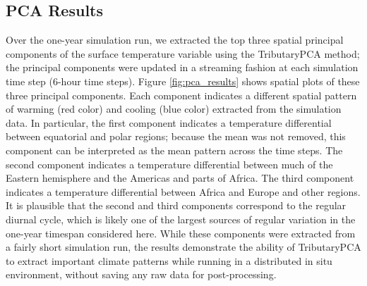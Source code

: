 \documentclass{juliacon}
\begin{document}
\subsection{PCA Results}
Over the one-year simulation run, we extracted the top three spatial principal components of the surface temperature variable using the TributaryPCA method; the principal components were updated in a streaming fashion at each simulation time step (6-hour time steps).
Figure \ref{fig:pca_results} shows spatial plots of these three principal components. 
Each component indicates a different spatial pattern of warming (red color) and cooling (blue color) extracted from the simulation data.
In particular, the first component indicates a temperature differential between equatorial and polar regions; because the mean was not removed, this component can be interpreted as the mean pattern across the time steps. 
The second component indicates a temperature differential between much of the Eastern hemisphere and the Americas and parts of Africa. 
The third component indicates a temperature differential between Africa and Europe and other regions.
It is plausible that the second and third components correspond to the regular diurnal cycle, which is likely one of the largest sources of regular variation in the one-year timespan considered here.
While these components were extracted from a fairly short simulation run, the results demonstrate the ability of TributaryPCA to extract important climate patterns while running in a distributed in situ environment, without saving any raw data for post-processing.
\end{document}
